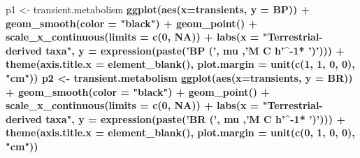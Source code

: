 \documentclass[]{article}
\newenvironment{Shaded}{\begin{snugshade}}{\end{snugshade}}
\newcommand{\DataTypeTok}[1]{\textcolor[rgb]{0.13,0.29,0.53}{#1}}
\newcommand{\DecValTok}[1]{\textcolor[rgb]{0.00,0.00,0.81}{#1}}
\newcommand{\KeywordTok}[1]{\textcolor[rgb]{0.13,0.29,0.53}{\textbf{#1}}}
\newcommand{\NormalTok}[1]{#1}
\newcommand{\OperatorTok}[1]{\textcolor[rgb]{0.81,0.36,0.00}{\textbf{#1}}}
\newcommand{\OtherTok}[1]{\textcolor[rgb]{0.56,0.35,0.01}{#1}}
\newcommand{\StringTok}[1]{\textcolor[rgb]{0.31,0.60,0.02}{#1}}
\begin{document}
\begin{Shaded}
\begin{Highlighting}[]
\NormalTok{p1 <-}\StringTok{ }\NormalTok{transient.metabolism }\OperatorTok{%
\StringTok{  }\KeywordTok{ggplot}\NormalTok{(}\KeywordTok{aes}\NormalTok{(}\DataTypeTok{x=}\NormalTok{transients, }\DataTypeTok{y =}\NormalTok{ BP)) }\OperatorTok{+}
\StringTok{  }\KeywordTok{geom_smooth}\NormalTok{(}\DataTypeTok{color =} \StringTok{"black"}\NormalTok{) }\OperatorTok{+}
\StringTok{  }\KeywordTok{geom_point}\NormalTok{() }\OperatorTok{+}\StringTok{ }
\StringTok{  }\KeywordTok{scale_x_continuous}\NormalTok{(}\DataTypeTok{limits =} \KeywordTok{c}\NormalTok{(}\DecValTok{0}\NormalTok{, }\OtherTok{NA}\NormalTok{)) }\OperatorTok{+}
\StringTok{  }\KeywordTok{labs}\NormalTok{(}\DataTypeTok{x =} \StringTok{"Terrestrial-derived taxa"}\NormalTok{,}
       \DataTypeTok{y =} \KeywordTok{expression}\NormalTok{(}\KeywordTok{paste}\NormalTok{(}\StringTok{'BP ('}\NormalTok{, mu ,}\StringTok{'M C h'}\OperatorTok{^-}\DecValTok{1}\OperatorTok{*}\StringTok{ ')'}\NormalTok{))) }\OperatorTok{+}
\StringTok{  }\KeywordTok{theme}\NormalTok{(}\DataTypeTok{axis.title.x =} \KeywordTok{element_blank}\NormalTok{(), }
                          \DataTypeTok{plot.margin =} \KeywordTok{unit}\NormalTok{(}\KeywordTok{c}\NormalTok{(}\DecValTok{1}\NormalTok{, }\DecValTok{1}\NormalTok{, }\DecValTok{0}\NormalTok{, }\DecValTok{0}\NormalTok{), }\StringTok{"cm"}\NormalTok{))}
\NormalTok{p2 <-}\StringTok{ }\NormalTok{transient.metabolism }\OperatorTok{%
\StringTok{  }\KeywordTok{ggplot}\NormalTok{(}\KeywordTok{aes}\NormalTok{(}\DataTypeTok{x=}\NormalTok{transients, }\DataTypeTok{y =}\NormalTok{ BR)) }\OperatorTok{+}
\StringTok{  }\KeywordTok{geom_smooth}\NormalTok{(}\DataTypeTok{color =} \StringTok{"black"}\NormalTok{) }\OperatorTok{+}
\StringTok{  }\KeywordTok{geom_point}\NormalTok{() }\OperatorTok{+}\StringTok{ }
\StringTok{  }\KeywordTok{scale_x_continuous}\NormalTok{(}\DataTypeTok{limits =} \KeywordTok{c}\NormalTok{(}\DecValTok{0}\NormalTok{, }\OtherTok{NA}\NormalTok{)) }\OperatorTok{+}
\StringTok{  }\KeywordTok{labs}\NormalTok{(}\DataTypeTok{x =} \StringTok{"Terrestrial-derived taxa"}\NormalTok{,}
       \DataTypeTok{y =} \KeywordTok{expression}\NormalTok{(}\KeywordTok{paste}\NormalTok{(}\StringTok{'BR ('}\NormalTok{, mu ,}\StringTok{'M C h'}\OperatorTok{^-}\DecValTok{1}\OperatorTok{*}\StringTok{ ')'}\NormalTok{))) }\OperatorTok{+}
\StringTok{  }\KeywordTok{theme}\NormalTok{(}\DataTypeTok{axis.title.x =} \KeywordTok{element_blank}\NormalTok{(),}
                          \DataTypeTok{plot.margin =} \KeywordTok{unit}\NormalTok{(}\KeywordTok{c}\NormalTok{(}\DecValTok{0}\NormalTok{, }\DecValTok{1}\NormalTok{, }\DecValTok{0}\NormalTok{, }\DecValTok{0}\NormalTok{), }\StringTok{"cm"}\NormalTok{))}
}}
\end{Highlighting}
\end{Shaded}
\end{document}
